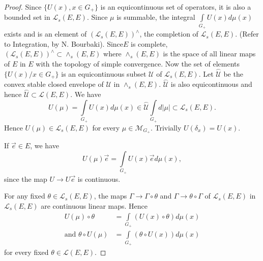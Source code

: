 \begin{proof}
Since $\{ U(x), x \in G_+\}$ is an equicontinuous set of operators, it
is also a bounded set in $\mathscr{L}_s(E, E)$. Since $\mu$ is
summable, the integral $\int\limits_{G_+}U(x) d \mu (x)$ exists and is
an element of $(\mathscr{L}_s(E, E))^\wedge$, the completion of
$\mathscr{L}_s(E, E)$. (Refer to Integration, by
N. Bourbaki). Since\pageoriginale $E$ is complete, $(\mathscr{L}_s(E,
E))^\wedge \subset \wedge_s(E, E)$ where $\wedge_s(E, E)$ is the space
of all linear maps of $E$ in $E$ with the topology of simple
convergence. Now the set of elements $\{U(x)/x \in G_+\}$ is an
equicontinuous subset $\mathscr{U}$ of $\mathscr{L}_s(E, E)$. Let
$\overset{\frown}{\mathscr{U}}$ be the convex stable closed envelope of
$\mathscr{U}$ in $\wedge_s(E, E)$. $\overset{\frown}{\mathscr{U}}$ is also
equicontinuous and hence $\overset{\frown}{\mathscr{U}} \subset \mathscr{L}(E,
E)$. We have
$$
U(\mu) = \int\limits_{G_+} U(x) d \mu(x) \in
\overset{\frown}{\mathscr{U}} \int\limits_{G_+} d |\mu | \subset
\mathscr{L}_s (E, E).
$$
Hence $U(\mu) \in \mathscr{L}_s(E, E)$ for every $\mu \in
\mathscr{M}_{G_+}$. Trivially $U(\delta_x)=U(x)$.

If $\overrightarrow{e} \in E$, we have
$$
U(\mu) \overrightarrow{e} = \int\limits_{G_+} U(x) \overrightarrow{e}
d \mu (x),
$$
since the map $U \to U \overrightarrow{e}$ is continuous.

For any fixed $\theta \in \mathscr{L}_s(E, E)$, the maps $\Gamma
\to \Gamma \circ \theta$ and $\Gamma \to \theta \circ \Gamma$ of
$\mathscr{L}_s(E, E)$ in $\mathscr{L}_s(E, E)$ are continuous linear
maps. Hence
\begin{align*}
U(\mu) \circ \theta &= \int\limits_{G_+} (U (x) \circ \theta) d \mu
(x)\\
\text{and }  \theta \circ U(\mu) &= \int\limits_{G_+}
(\theta \circ U(x)) d \mu (x) 
\end{align*}
for every fixed $\theta \in \mathscr{L}(E, E)$. 
\end{proof}
